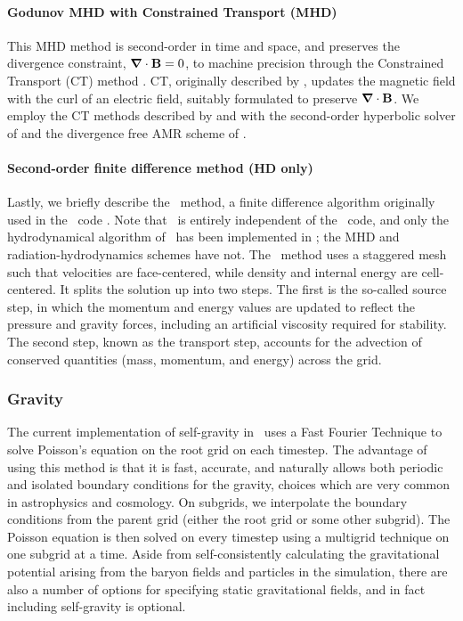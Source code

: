\paragraph{Godunov MHD with Constrained Transport (MHD)}
This MHD method is second-order in time and space, and preserves the
divergence constraint, $\bm{\nabla} \cdot \mathbf{B} = 0$, to machine precision
through the Constrained Transport (CT) method \citep{Collins10}.  CT, originally
described by \citet{Evans88}, updates the magnetic field with the curl
of an electric field, suitably formulated to preserve $\bm{\nabla} \cdot
\mathbf{B}$.  We employ the CT methods described by \citet{Balsara99} and
\citet{Gardiner05} with the second-order hyperbolic
solver of \citet{Li08a} and the divergence free AMR scheme of
\citet{Balsara01}.

\paragraph{Second-order finite difference method (HD only)}

Lastly, we briefly describe the \zeus\ method, a finite difference
algorithm originally used in the \zeus\ code \citep{Stone92a}. Note
that \enzo\ is entirely independent of the \zeus\ code, and only the
hydrodynamical algorithm of \zeus\ has been implemented in \enzo; the
MHD and radiation-hydrodynamics schemes have not. The \zeus\ method
uses a staggered mesh such that velocities are face-centered, while
density and internal energy are cell-centered.  It splits the solution
up into two steps. The first is the so-called source step, in which
the momentum and energy values are updated to reflect the pressure and
gravity forces, including an artificial viscosity required for
stability. The second step, known as the transport step, accounts for
the advection of conserved quantities (mass, momentum, and energy)
across the grid.

\subsubsection{Gravity}

The current implementation of self-gravity in \enzo\ uses a Fast
Fourier Technique \citep{Hockney88} to solve Poisson's equation on the
root grid on each timestep.  The advantage of using this method is
that it is fast, accurate, and naturally allows both periodic and
isolated boundary conditions for the gravity, choices which are very
common in astrophysics and cosmology.  On subgrids, we interpolate the
boundary conditions from the parent grid (either the root grid or some
other subgrid). The Poisson equation is then solved on every timestep
using a multigrid technique on one subgrid at a time. Aside from
self-consistently calculating the gravitational potential arising from
the baryon fields and particles in the simulation, there are also a
number of options for specifying static gravitational fields, and in
fact including self-gravity is optional.

